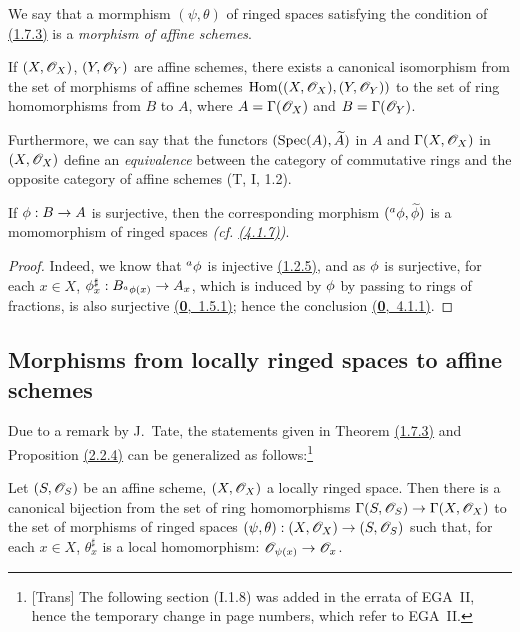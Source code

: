 We say that a mormphism $(\psi,\theta)$ of ringed spaces satisfying the condition of
\hyperref[thm-1.1.7.3]{(1.7.3)} is a {\it morphism of affine schemes}.

\begin{cor}[1.7.4]
\label{cor-1.1.7.4}
If $(X,\mathscr{O}_X)$, $(Y,\mathscr{O}_Y)$ are affine schemes, there exists a canonical isomorphism from
the set of morphisms of affine schemes ${\mathop{\mathrm{Hom}}\nolimits}((X,\mathscr{O}_X),(Y,\mathscr{O}_Y))$ to the set of
ring homomorphisms from $B$ to $A$, where $A=\Gamma(\mathscr{O}_X)$ and $B=\Gamma(\mathscr{O}_Y)$.
\end{cor}

Furthermore, we can say that the functors $({\mathop{\mathrm{Spec}}\nolimits}(A),\widetilde{A})$ in $A$ and
$\Gamma(X,\mathscr{O}_X)$ in $(X,\mathscr{O}_X)$ define an {\it equivalence} between the category of
commutative rings and the opposite category of affine schemes (T, I, 1.2).

\begin{cor}[1.7.5]
\label{cor-1.1.7.5}
If $\phi:B\to A$ is surjective, then the corresponding morphism
$({}^a\phi,\widetilde{\phi})$ is a momomorphism of ringed spaces
{\it (cf. \hyperref[env-1.4.1.7]{(4.1.7)})}.
\end{cor}

\begin{proof}
\label{proof-cor-1.1.7.5}
Indeed, we know that ${}^a\phi$ is injective \hyperref[env-1.1.2.5]{(1.2.5)}, and as $\phi$ is
surjective, for each $x\in X$, $\phi_x^\sharp:B_{{}^a\phi(x)}\to A_x$, which is induced
by $\phi$ by passing to rings of fractions, is also surjective \hyperref[env-0.1.5.1]{(\textbf{0},~1.5.1)}; hence
the conclusion \hyperref[env-0.4.1.1]{(\textbf{0},~4.1.1)}.
\end{proof}

\subsection{Morphisms from locally ringed spaces to affine schemes}
\label{subsection-morphisms-lrs-to-affine-schemes}

Due to a remark by J.~Tate, the statements given in Theorem \hyperref[thm-1.1.7.3]{(1.7.3)}
and Proposition \hyperref[prop-1.2.2.4]{(2.2.4)}
can be generalized as follows:\footnote{[Trans] The following section (I.1.8) was added in
the errata of EGA~II, hence the temporary change in page numbers, which refer to EGA~II.}

\begin{prop}[1.8.1]
\label{prop-1.1.8.1}
Let $(S,\mathscr{O}_S)$ be an affine scheme, $(X,\mathscr{O}_X)$ a locally ringed space. Then there is a
canonical bijection from the set of ring homomorphisms
$\Gamma(S,\mathscr{O}_S)\to\Gamma(X,\mathscr{O}_X)$ to the set of morphisms of ringed spaces
$(\psi,\theta):(X,\mathscr{O}_X)\to(S,\mathscr{O}_S)$ such that, for each $x\in X$, $\theta_x^\sharp$ is a
local homomorphism: $\mathscr{O}_{\psi(x)}\to\mathscr{O}_x$.
\end{prop}

